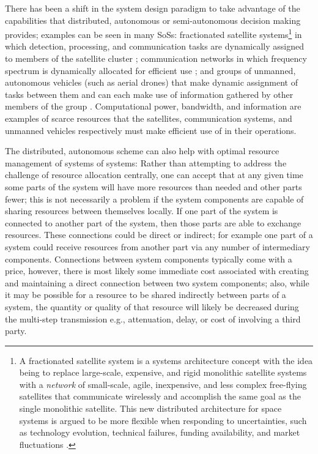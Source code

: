 \documentclass[journal,onecolumn]{IEEEtran}
\theoremstyle{plain}
\begin{document}
There has been a shift in the system design paradigm to take advantage of the capabilities that distributed, autonomous or semi-autonomous decision making provides; examples can be seen in many SoSs: fractionated satellite systems\footnote{A fractionated satellite system is a systems architecture concept with the idea being to replace large-scale, expensive, and rigid monolithic satellite systems with a \textit{network} of small-scale, agile, inexpensive, and less complex free-flying satellites that communicate wirelessly and accomplish the same goal as the single monolithic satellite. This new distributed architecture for space systems is argued to be more flexible when responding to uncertainties, such as technology evolution, technical failures, funding availability, and market fluctuations \citep{brown2006value}.} in which detection, processing, and communication tasks are dynamically assigned to members of the satellite cluster \citep{brown2009value, mosleh2014optimal}; communication networks in which frequency spectrum is dynamically allocated for efficient use \citep{mitola1999cognitive, ji2007cognitive}; and groups of unmanned, autonomous vehicles (such as aerial drones) that make dynamic assignment of tasks between them and can each make use of information gathered by other members of the group \citep{alighanbari2005decentralized}. Computational power, bandwidth, and information are examples of scarce resources that the satellites, communication systems, and unmanned vehicles respectively must make efficient use of in their operations. 






The distributed, autonomous scheme can also help with optimal resource management of systems of systems: Rather than attempting to address the challenge of resource allocation centrally, one can accept that at any given time some parts of the system will have more resources than needed and other parts fewer; this is not necessarily a problem if the system components are capable of sharing resources between themselves locally. If one part of the system is connected to another part of the system, then those parts are able to exchange resources. These connections could be direct or indirect; for example one part of a system could receive resources from another part via any number of intermediary components. Connections between system components typically come with a price, however, there is most likely some immediate cost associated with creating and maintaining a direct connection between two system components; also, while it may be possible for a resource to be shared indirectly between parts of a system, the quantity or quality of that resource will likely be decreased during the multi-step transmission e.g., attenuation, delay, or cost of involving a third party. 
\end{document}
